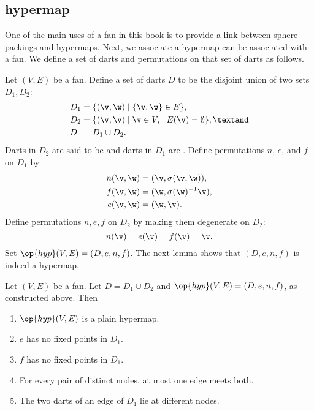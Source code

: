 \subsection{hypermap}
One of the main uses of a fan in this book is to provide a link between sphere
packings and hypermaps.  Next, we associate a hypermap can be associated
with a fan.   We define a set of darts and permutations on that set of darts as follows.

Let $(V,E)$ be a fan.  Define a set of darts $D$ to be the disjoint union of
two sets $D_1,D_2$:
\begin{align*}
D_1 &= \{(\v,\w)\mid \{\v,\w\}\in E\},\\
D_2 &= \{(\v,\v) \mid \v\in V,\ \ E(\v) = \emptyset\},\textand \\
D\phantom{_2}   &= D_1\cup D_2.
\end{align*}
Darts in $D_2$ are said to be  and darts in
$D_1$ are .
%
%
%
%
%
Define permutations $n$, $e$, and $f$ on $D_1$ by
\begin{align*}n(\v,\w) &= (\v,\sigma(\v,\w)),\\
f (\v,\w) &= (\w,\sigma(\w)^{-1} \v),\\
e (\v,\w) &= (\w,\v).
\end{align*}
Define permutations $n,e,f$ on $D_2$ by making them degenerate on $D_2$:
\[ 
n (\v) = e(\v) = f(\v) = \v.
\] 
Set %
$\op{hyp}(V,E)=(D,e,n,f)$. %
The next lemma shows that $(D,e,n,f)$ is indeed a hypermap.



\begin{lemma}[]\label{lemma:fan-plain}
Let $(V,E)$ be a fan.  Let $D = D_1\cup D_2$
and $\op{hyp}(V,E) = (D,e,n,f)$, as constructed above.  Then
\begin{enumerate}\wasitemize 
\item $\op{hyp}(V,E)$ is a plain hypermap.
\item  $e$ has no fixed
points in $D_1$.
\item  $f$ has no fixed points in $D_1$.
\item For every pair of distinct nodes,  at most one
edge  meets both.
\item The two darts of an edge of $D_1$ lie at different nodes.
\end{enumerate}\wasitemize 
{}%
\end{lemma}


